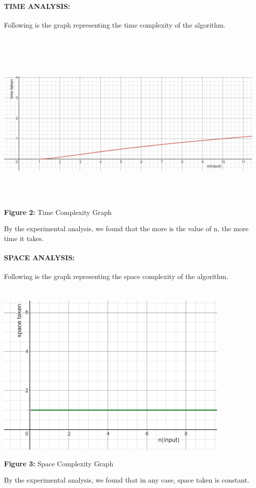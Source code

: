 \documentclass[10pt]{article}
\begin{document}
\begin{multicols*}{2}
\paragraph{TIME ANALYSIS:}Following is the graph representing the time complexity of the algorithm.\\\\\\
\includegraphics[width=\columnwidth, height=8cm]{Time Complexity.png}\begin{center}\textbf{Figure 2:} Time Complexity Graph\end{center}By the experimental analysis, we found that the more is the value of n, the more time it takes.

\paragraph{SPACE ANALYSIS:}Following is the graph representing the space complexity of the algorithm.\\\\\\
\includegraphics[width=\columnwidth, height=8cm]{Space Complexity.png}\begin{center}\textbf{Figure 3:} Space Complexity Graph\end{center}By the experimental analysis, we found that in any case, space taken is constant.
\newpage

\end{multicols*}
\end{document}
